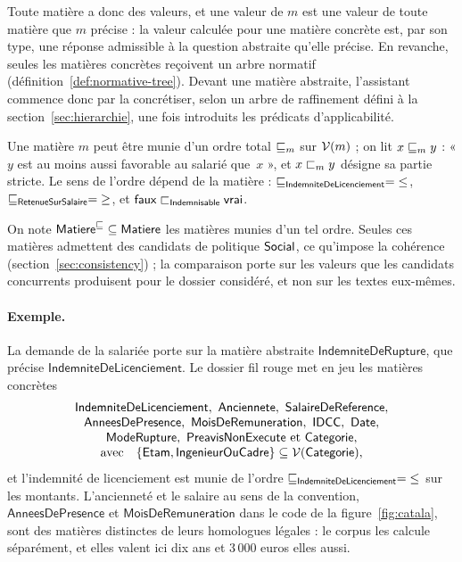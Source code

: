 \documentclass[review]{jflart}
\newcommand{\Categorie}{\ensuremath{\mathsf{Categorie}}}
\newcommand{\Cadre}{\ensuremath{\mathsf{IngenieurOuCadre}}}
\newcommand{\Etam}{\ensuremath{\mathsf{Etam}}}
\newcommand{\Presence}{\ensuremath{\mathsf{AnneesDePresence}}}
\newcommand{\MoisRem}{\ensuremath{\mathsf{MoisDeRemuneration}}}
\newcommand{\ModeRupture}{\ensuremath{\mathsf{ModeRupture}}}
\newcommand{\PreavisNE}{\ensuremath{\mathsf{PreavisNonExecute}}}
\newcommand{\IndemRupture}{\ensuremath{\mathsf{IndemniteDeRupture}}}
\renewcommand{\Indem}{\ensuremath{\mathsf{IndemniteDeLicenciement}}}
\begin{document}
Toute matière a donc des valeurs, et une valeur de \(m\) est une valeur de
toute matière que \(m\) précise : la valeur calculée pour une matière concrète
est, par son type, une réponse admissible à la question abstraite qu'elle
précise. En revanche, seules les
matières concrètes reçoivent un arbre normatif
(définition~\ref{def:normative-tree}). Devant une matière abstraite,
l'assistant commence donc par la concrétiser, selon un arbre de raffinement
défini à la section~\ref{sec:hierarchie}, une fois introduits les prédicats
d'applicabilité.

\begin{defi}\label{def:favorable}
Une matière \(m\) peut être munie d'un ordre total \(\mathrel{\sqsubseteq_{m}}\) sur
\(\mathcal{V}(m)\) ;
on lit \(x\mathrel{\sqsubseteq_{m}}y\) : « \(y\) est au moins aussi favorable au salarié
que~\(x\) », et \(x\mathrel{\sqsubset_{m}}y\) désigne sa partie stricte. Le sens de
l'ordre dépend de la matière :
\(\fav{\Indem}=\mathord{\leq}\),
\(\mathrel{\sqsubseteq_{\mathsf{RetenueSurSalaire}}}=\mathord{\geq}\), et
\(\mathsf{faux}\mathrel{\sqsubset_{\mathsf{Indemnisable}}}\mathsf{vrai}\).
\end{defi}

On note \(\mathsf{Matiere}^{\sqsubseteq}\subseteq\mathsf{Matiere}\) les matières munies d'un tel ordre.
Seules ces matières admettent des candidats de politique \(\mathsf{Social}\), ce
qu'impose la cohérence (section~\ref{sec:consistency}) ; la comparaison porte
sur les valeurs que les candidats concurrents produisent pour le dossier
considéré, et non sur les textes eux-mêmes.

\paragraph{Exemple.} La demande de la salariée porte sur la matière abstraite
\(\IndemRupture\), que précise \(\Indem\). Le dossier fil rouge met en jeu
les matières concrètes
\[
\begin{array}{c}
\Indem,\ \Senior,\ \Salary,\\
\Presence,\ \MoisRem,\ \IDCC,\ \DateT,\\
\ModeRupture,\ \PreavisNE\ \text{et}\ \Categorie,\\
\text{avec}\quad\{\Etam,\Cadre\}\subseteq\Raw(\Categorie),
\end{array}
\]
et l'indemnité de licenciement est munie de l'ordre
\(\fav{\Indem}=\mathord{\leq}\) sur les
montants. L'ancienneté et le salaire au sens de la convention, \(\Presence\) et
\(\MoisRem\) dans le code de la figure~\ref{fig:catala}, sont des matières
distinctes de leurs homologues légales : le corpus les calcule séparément, et
elles valent ici dix ans et 3\,000 euros elles aussi.
\end{document}

